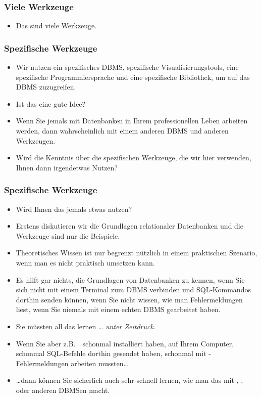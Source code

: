 \documentclass[aspectratio=169,mathserif,notheorems]{beamer}%
\begin{document}
%
\begin{frame}%
\frametitle{Viele Werkzeuge}%
\begin{itemize}%
\item Das sind viele Werkzeuge.%
\end{itemize}%
%
\end{frame}%
%
\begin{frame}%
\frametitle{Spezifische Werkzeuge}%
\begin{itemize}%
\item Wir nutzen ein spezifisches DBMS, spezifische Visualisierungstools, eine spezifische Programmiersprache und eine spezifische Bibliothek, um auf das DBMS zuzugreifen.%
\item<2-> Ist das eine gute Idee?%
\item<3-> Wenn Sie jemals mit Datenbanken in Ihrem professionellen Leben arbeiten werden, dann wahrscheinlich mit einem anderen DBMS und anderen Werkzeugen.
\item<4-> Wird die Kenntnis über die spezifischen Werkzeuge, die wir hier verwenden, Ihnen dann irgendetwas Nutzen?%
\end{itemize}%
\end{frame}%
%
\begin{frame}%
\frametitle{Spezifische Werkzeuge}%
\begin{itemize}%
\item Wird Ihnen das jemals etwas nutzen?%
\item<3-> Erstens diskutieren wir die Grundlagen relationaler Datenbanken und die Werkzeuge sind nur die Beispiele.%
\item<4-> Theoretisches Wissen ist nur begrenzt nützlich in einem praktischen Szenario, wenn man es nicht praktisch umsetzen kann.%
\item<5-> Es hilft gar nichts, die Grundlagen von Datenbanken zu kennen, wenn Sie sich nicht mit einem Terminal zum DBMS verbinden und SQL-Kommandos dorthin senden können, wenn Sie nicht wissen, wie man Fehlermeldungen liest, wenn Sie niemals mit einem echten DBMS gearbeitet haben.%
\item<6-> Sie müssten all das lernen {\dots} \emph{unter Zeitdruck.}%
\item<7-> Wenn Sie aber z.B.\ \postgresql\ schonmal installiert haben, auf Ihrem Computer, schonmal SQL-Befehle dorthin gesendet haben, schonmal mit \postgresql-Fehlermeldungen arbeiten mussten\dots%
\item<8-> {\dots}dann können Sie sicherlich auch sehr schnell lernen, wie man das mit \mysql, \mariadb, oder anderen DBMSen macht.%
\end{itemize}%
\end{frame}%
\end{document}
